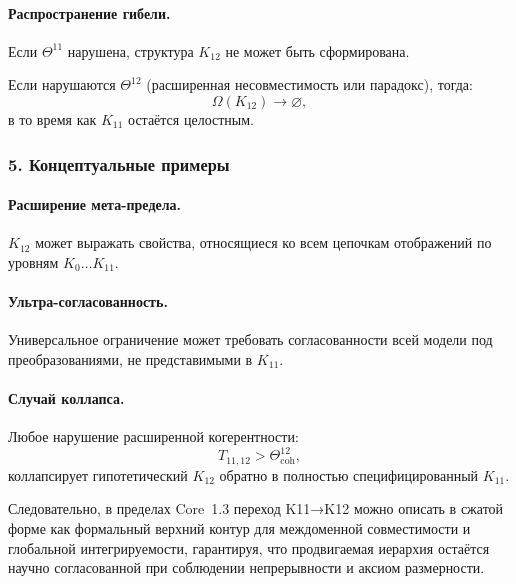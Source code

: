 \paragraph{Распространение гибели.}
Если $\Theta^{11}$ нарушена, структура $K_{12}$ не может быть сформирована.

Если нарушаются $\Theta^{12}$ (расширенная несовместимость или парадокс), тогда:
\[
\Omega(K_{12}) \rightarrow \varnothing,
\]
в то время как $K_{11}$ остаётся целостным.

\subsubsection{5. Концептуальные примеры}

\paragraph{Расширение мета-предела.}
$K_{12}$ может выражать свойства, относящиеся ко всем цепочкам отображений
по уровням $K_0\dots K_{11}$.

\paragraph{Ультра-согласованность.}
Универсальное ограничение может требовать согласованности всей модели под
преобразованиями, не представимыми в $K_{11}$.

\paragraph{Случай коллапса.}
Любое нарушение расширенной когерентности:
\[
T_{11,12} > \Theta^{12}_{\mathrm{coh}},
\]
коллапсирует гипотетический $K_{12}$ обратно в полностью специфицированный
$K_{11}$.

Следовательно, в пределах Core~1.3 переход K11→K12 можно описать в сжатой форме
как формальный верхний контур для междоменной совместимости и глобальной
интегрируемости, гарантируя, что продвигаемая иерархия остаётся научно
согласованной при соблюдении непрерывности и аксиом размерности.
